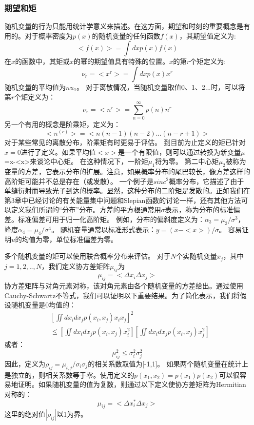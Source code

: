 \documentclass[12pt, UTF8]{ctexart}%
\numberwithin{equation}{section}
\numberwithin{figure}{section}
\newcommand{\InsertEqution}[2]{\begin{equation}
  \label{#1}
   #2
 \end{equation}}
\newcommand{\InsertInlineEq}[1]{$#1$}
\begin{document}
\begin{sloppypar}
\subsubsection{期望和矩}
随机变量的行为只能用统计学意义来描述。在这方面，期望和时刻的重要概念是有用的。对于概率密度为\InsertInlineEq{p(x)}的随机变量的任何函数\InsertInlineEq{f(x)}，其期望值定义为:
\InsertEqution{7.13}{<f(x)>=\int d x p(x) f(x)}
在\InsertInlineEq{x}的函数中，其矩或\InsertInlineEq{x}的幂的期望值具有特殊的位置。\InsertInlineEq{x}的第\InsertInlineEq{r}个矩定义为:
\InsertEqution{7.14}{\nu_{r}=<x^{r}>=\int d x p(x) x^{r}}
随机变量的平均值为\InsertInlineEq{nu_1}。 对于离散情况，当随机变量取值0、1、2...时，可以将第\InsertInlineEq{r}个矩定义为：
\InsertEqution{7.15}{\nu_{r}=<n^{r}>=\sum_{n=0}^{\infty} p(n) n^{r}}
另一个有用的概念是阶乘矩，定义为：
\InsertEqution{7.16}{<n^{(r)}>=<n(n-1)(n-2) \dots(n-r+1)>}
对于某些常见的离散分布，阶乘矩有时更易于评估。 到目前为止定义的矩已针对\InsertInlineEq{x=0}进行了定义。如果平均值\InsertInlineEq{<x>}是一个有限值，则可以通过转换为新变量\InsertInlineEq\mu={x-<x>}来谈论中心矩。 在这种情况下，一阶矩\InsertInlineEq{\mu_1}将为零。 第二中心矩\InsertInlineEq{\mu_2}被称为变量的方差，它表示分布的扩展。注意，如果概率分布的尾巴较长，像方差这样的高阶矩可能并不总是存在（或发散）。 一个例子是\InsertInlineEq{sinc^2}概率分布，它描述了由于单缝衍射而导致光子到达的概率。显然，这种分布的二阶矩是发散的。正如我们在第3章中已经讨论的有关能量集中问题和Slepian函数的讨论一样，还有其他方法可以定义我们所谓的“分布”分布。方差的平方根通常用\InsertInlineEq{\sigma}表示，称为分布的标准偏差。标准偏差可用于归一化高阶矩。 例如，分布的偏斜度定义为：\InsertInlineEq{\alpha_3 = \mu_3/\sigma^3}，峰度\InsertInlineEq{\alpha_4 = \mu_4/\sigma^4}。 随机变量通常以标准形式表示：\InsertInlineEq{y=(x-<x>)/\sigma}。 容易证明\InsertInlineEq{u}的均值为零，单位标准偏差为零。

多个随机变量的矩可以使用联合概率分布来评估。 对于\InsertInlineEq{N}个实随机变量\InsertInlineEq{x_j}，其中\InsertInlineEq{j=1,2,..,N}，我们定义协方差矩阵\InsertInlineEq{\mu_{ij}}为
\InsertEqution{7.17}{\mu_{i j}=<\Delta x_{i} \Delta x_{j}>}
协方差矩阵与对角元素对称，该对角元素由各个随机变量的方差给出。通过使用Cauchy-Schwartz不等式，我们可以证明以下重要结果。为了简化表示，我们将假设随机变量是0均值的：
\InsertEqution{7.18}{\begin{aligned}
  &\left[\iint d x_{i} d x_{j} p\left(x_{i}, x_{j}\right) x_{i} x_{j}\right]^{2} \\
  &\leq\left[\iint d x_{i} d x_{j} p\left(x_{i}, x_{j}\right) x_{i}^{2}\right]\left[\iint d x_{i} d x_{j} p\left(x_{i}, x_{j}\right) x_{j}^{2}\right]
  \end{aligned}}
或者：
\InsertEqution{7.19}{\mu_{i j}^{2} \leq \sigma_{i}^{2} \sigma_{j}^{2}}
因此，定义为\InsertInlineEq{\rho_{ij}=\mu_{i,j}/\sigma_i \sigma_j}的相关系数取值为[-1,1]。 如果两个随机变量在统计上是独立的，则相关系数等于零。使用定义的\InsertInlineEq{p(x_1,x_2)=p(x_1)p(x_2)}可以很容易地证明。如果随机变量的值为复数，则通过以下定义使协方差矩阵为Hermitian对称的：
\InsertEqution{7.20}{\mu_{i j}=<\Delta x_{i}^{*} \Delta x_{j}>}
这里的绝对值\InsertInlineEq{\left|\rho_{i j}\right|}以1为界。

\end{sloppypar}
\end{document}

